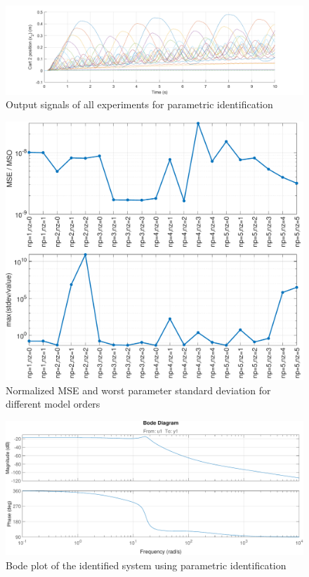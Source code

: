 \documentclass[11pt]{article}
\begin{document}
\begin{figure}[!ht]
\centering
\includegraphics[width=\textwidth]{sysid-outputs.pdf}
\caption{Output signals of all experiments for parametric identification}
\label{fig:outputs-param}
\end{figure}


\begin{figure}[!ht]
\centering
\includegraphics[width=\textwidth]{sysid-errors-fig.pdf}
\caption{Normalized MSE and worst parameter standard deviation for different model orders}
\label{fig:errors-param}
\end{figure}


\begin{figure}[!ht]
\centering
\includegraphics[width=\textwidth]{bodeid-param.pdf}
\caption{Bode plot of the identified system using parametric identification}
\label{fig:bodeid_param}
\end{figure}
\end{document}
